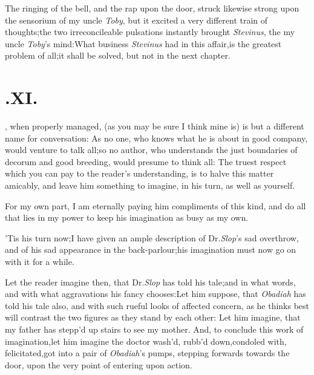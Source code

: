 \documentclass{article}
\begin{document}
The ringing of the bell, and the rap upon the door, struck
likewise strong\break
upon the sensorium of my uncle \textit{Toby},\tsk\break 
but it excited a very different train of
thoughts;\tsk the two irreconcileable pulsations instantly
brought \textit{Stevinus}, the\break
{}
my uncle \textit{Toby}’s mind:\tsk What business
\textit{Stevinus} had in this affair,\tsk is the greatest
problem of all;\tsh it shall be solved,\tsk\break
but not in the next chapter.

\vskip 30pt
\newpage

\null
\section{.\enspace  XI.}

, when properly managed, (as
you may be sure I think mine is) is but a different name for
conversation: As no one, who knows what he is about in good
company, would venture to talk all;\tsk so no author, who
understands the just boundaries of decorum and good breeding, would
presume to think all: The truest respect which you can pay to the
reader’s understanding, is to halve this matter amicably, and
leave him something to imagine, in his turn,\break
as well as yourself.

For my own part, I am eternally paying him compliments of this
kind, and do all that lies in my power to keep his\break
imagination as busy as my own.

’Tis his turn now;\tsk I have given an ample description of Dr.\@ \textit{Slop}’s sad
overthrow, and of his sad appearance in the back-parlour;\tsk his
imagination must now go on with it for a while.

Let the reader imagine then, that Dr.\@ \textit{Slop} has told his
tale;\tsk and in what words, and with what aggravations his fancy
chooses:\tsk Let him suppose, that \textit{Obadiah} has told his
tale also, and with such rueful looks of affected concern,\break
as he thinks best will contrast the two\break
figures as they stand by each other:\tsk\break
Let him imagine, that my father has\break
stepp’d up stairs to see my mother.\tsk\break 
And, to conclude this work of imagination,\tsk let him
imagine the doctor wash’d,\break
\tsk rubb’d down,\tsk condoled with,\tsk\break
felicitated,\tsk got into a pair of \textit{Obadiah}’s\break
pumps, stepping forwards towards the
door, upon the very point of entering\break
upon action.
\end{document}
